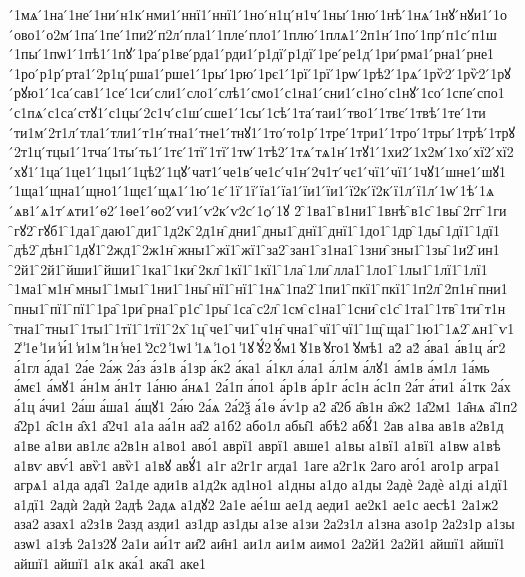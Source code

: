 {́1мѧ
́1на
́1не
́1ни
́н1к
́нми1
́ннї1
́ннї1
́1но
́н1ц
́н1ч
́1ны
́1ню
́1нѣ
́1нѧ
́1нꙋ
́нꙋи1
́1о
́ово1
́о2м
́1па
́1пе
́1пи2
́п2л
́пла1
́1пле
́пло1
́1плю
́1плѧ1
́2п1н
́1по
́1пр
́п1с
́п1ш
́1пы
́1пѡ1
́1пѣ1
́1пꙋ
́1ра
́р1ве
́рда1
́рди1
́р1дї
́р1дї
́1ре
́ре1д
́1ри
́рма1
́рна1
́рне1
́1ро
́р1р
́рта1
́2р1ц
́рша1
́рше1
́1ры
́1рю
́1рє1
́1рї
́1рї
́1рѡ
́1рѣ2
́1рѧ
́1рѷ2
́1рѷ2
́1рꙋ
́рꙋю1
́1са
́сав1
́1се
́1си
́сли1
́сло1
́слѣ1
́смо1
́с1на1
́сни1
́с1но
́с1нꙋ
́1со
́1спе
́спо1
́с1пѧ
́с1са
́стꙋ1
́с1цы
́2с1ч
́с1ш
́сше1
́1сы
́1сѣ
́1та
́таи1
́тво1
́1твє
́1твѣ
́1те
́1ти
́ти1м
́2т1л
́тла1
́тли1
́т1н
́тна1
́тне1
́тнꙋ1
́1то
́то1р
́1тре
́1три1
́1тро
́1тры
́1трѣ
́1трꙋ
́2т1ц
́тцы1
́1тча
́1ты
́ть1
́1тє
́1тї
́1тї
́1тѡ
́1тѣ2
́1тѧ
́тѧ1н
́1тꙋ1
́1хи2
́1х2м
́1хо
́хї2
́хї2
́хꙋ1
́1ца
́1це1
́1цы1
́1цѣ2
́1цꙋ
́чат1
́че1в
́че1с
́ч1н
́2ч1т
́чє1
́чї1
́чї1
́1чꙋ1
́шне1
́шꙋ1
́1ща1
́щна1
́щно1
́1щє1
́щѧ1
́1ю
́1є
́1ї
́1ї
́їа1
́їа1
́їи1
́їи1
́ї2к
́ї2к
́ї1л
́ї1л
́1ѡ
́1ѣ
́1ѧ
́ѧв1
́ѧ1т
́ѧти1
́ѳ2
́1ѳе1
́ѳо2
́ѵи1
́ѵ2к
́ѵ2с
́1ѻ
́1ꙋ
2̑
̑1ва1
̑в1ни1
̑1внѣ
̑в1с
̑1вы
̑2гг
̑1ги
̑гꙋ2
̑гꙋб1
̑1да1
̑даю1
̑ди1
̑1д2к
̑2д1н
̑дни1
̑дны1
̑днї1
̑днї1
̑1до1
̑1др
̑1ды
̑1дї1
̑1дї1
̑дѣ2
̑дѣн1
̑1дꙋ1
̑2жд1
̑2ж1н
̑жны1
̑жї1
̑жї1
̑за2
̑зан1
̑з1на1
̑1зни
̑зны1
̑1зы
̑1и2
̑ин1
̑2й1
̑2й1
̑йши1
̑йши1
̑1ка1
̑1ки
̑2кл
̑1кї1
̑1кї1
̑1ла
̑1ли
̑лла1
̑1ло1
̑1лы1
̑1лї1
̑1лї1
̑1ма1
̑м1н
̑мны1
̑1мы1
̑1ни1
̑1ны
̑нї1
̑нї1
̑1нѧ
̑1па2
̑1пи1
̑пкї1
̑пкї1
̑1п2л
̑2п1н
̑пни1
̑пны1
̑пї1
̑пї1
̑1ра
̑1ри
̑рна1
̑р1с
̑1ры
̑1са
̑с2л
̑1см
̑с1на1
̑1сни
̑с1с
̑1та1
̑1тв
̑1ти
̑т1н
̑тна1
̑тны1
̑1ты1
̑1тї1
̑1тї1
̑2х
̑1ц
̑че1
̑чи1
̑ч1н
̑чна1
̑чї1
̑чї1
̑1щ
̑ща1
̑1ю1
̑1ѧ2
̑ѧн1
̑ѵ1
2̾
̾1е
̾1и
̾и́1
̾и1м
̾1н
̾не1
̾2с2
̾1ѡ1
̾1ѧ
̾1ѻ1
̾1ꙋ
̾ꙋ́2
̾ꙋ́м1
̾ꙋ1в
̾ꙋго1
̾ꙋмѣ1
а2̀
а2́
а́ва1
а́в1ц
а́г2
а́1гл
а́да1
2а́е
2а́ж
2а́з
а́з1в
а́1зр
а́к2
а́ка1
а́1кл
а́ла1
а́л1м
а́лꙋ1
а́м1в
а́м1л
1а́мь
а́мє1
а́мꙋ1
а́н1м
а́н1т
1а́ню
а́нѧ1
2а́1п
а́по1
а́р1в
а́р1г
а́с1н
а́с1п
2а́т
а́ти1
а́1тк
2а́х
а́1ц
а́чи1
2а́ш
а́ша1
а́щꙋ1
2а́ю
2а́ѧ
2а́2ѯ
а́1ѳ
а́ѵ1р
а2̑
а̑2б
а̑в1н
а̑ж2
1а̑2м1
1а̑нѧ
а̑1п2
а̑2р1
а̑с1н
а̑х1
а̑2ч1
а1а
аа́1н
аа̑2
а1б2
або1л
абы̑1
абѣ2
абꙋ́1
2ав
а1ва
ав1в
а2в1д
а1ве
а1ви
ав1лє
а2в1н
а1во1
аво́1
аврї1
аврї1
авше1
а1вы
а1вї1
а1вї1
а1вѡ
а1вѣ
а1вѵ
авѵ́1
авѷ1
авѷ1
а1вꙋ
авꙋ́1
а1г
а2г1г
агда1
1аге
а2г1к
2аго
аго́1
аго1р
агра1
агрѧ1
а1да
ада̑1
2а1де
ади1в
а1д2к
ад1но1
а1дны
а1до
а1ды
2адѐ
2адѐ
а1ді
а1дї1
а1дї1
2адѝ
2адѝ
2адѣ
2адѧ
а1дꙋ2
2а1е
ае́1ш
ае1д
аеди1
ае2к1
ае1с
аесѣ1
2а1ж2
аза2
азах1
а2з1в
2азд
азди1
аз1др
аз1ды
а1зе
а1зи
2а2з1л
а1зна
азо1р
2а2з1р
а1зы
азѡ1
а1зѣ
2а1з2ꙋ
2а1и
аи́1т
аи̑2
аи̑н1
аи1л
аи1м
аимо1
2а2й1
2а2й1
айшї1
айшї1
айшї1
айшї1
а1к
ака́1
ака̑1
аке1
}
